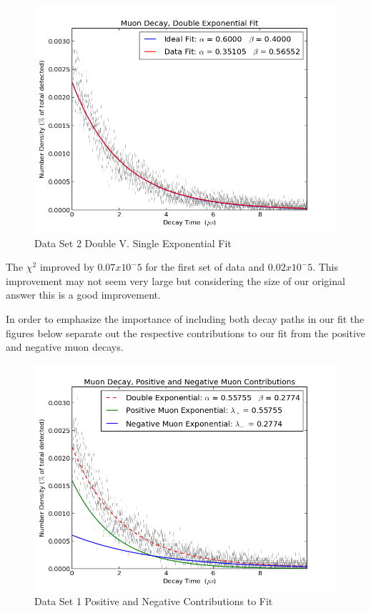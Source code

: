 \begin{figure}[H]
\begin{center}
\includegraphics[width=4 in]{graph_EPBB2_DbleExp.png}
\caption{Data Set 2 Double V. Single Exponential Fit}
\end{center}
\end{figure}

\indent \indent The $\chi^2$ improved by $0.07 x 10^-5$  for the first set of data and $0.02 x 10^-5$. This improvement may not seem very large but considering the size of our original answer this is a good improvement. 

\indent \indent In order to emphasize the importance of including both decay paths in our fit the figures below separate out the respective contributions to our fit from the positive and negative muon decays. 

\begin{figure}[H]
\begin{center}
\includegraphics[width=4 in]{graph_EPBB1_CompExp.png}
\caption{Data Set 1 Positive and Negative Contributions to Fit}
\end{center}
\end{figure}

